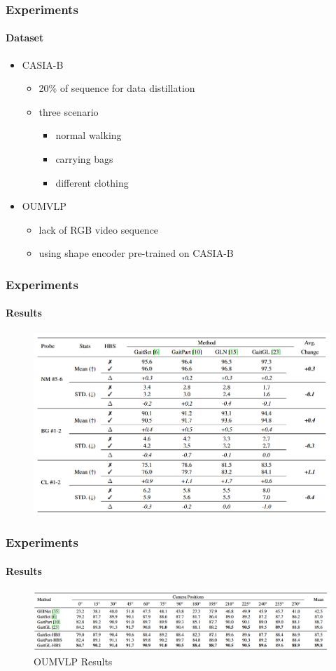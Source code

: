 \documentclass[
	11pt, %
	aspectratio=169, %
]{beamer}
\begin{document}
\begin{frame}
	\frametitle{Experiments}
	\framesubtitle{Dataset}

	\begin{itemize}
		\item CASIA-B
		\begin{itemize}
			\item 20\% of sequence for data distillation
			\item three scenario
			\begin{itemize}
				\item normal walking
				\item carrying bags
				\item different clothing
			\end{itemize}
		\end{itemize}
		\item OUMVLP
		\begin{itemize}
			\item lack of RGB video sequence
			\item using shape encoder pre-trained on CASIA-B
		\end{itemize}
	\end{itemize}
\end{frame}

\begin{frame}
	\frametitle{Experiments}
	\framesubtitle{Results}

	\begin{figure}
		\centering
		\includegraphics[width=0.7\linewidth]{"./Images/CASIA_result.png"}
	\end{figure}
\end{frame}

\begin{frame}
	\frametitle{Experiments}
	\framesubtitle{Results}

	\begin{figure}
		\centering
		\includegraphics[width=\linewidth]{"./Images/OUMVLP_result.png"}
		\caption{OUMVLP Results}
	\end{figure}
\end{frame}
\end{document}
